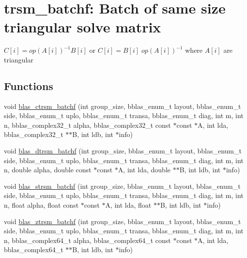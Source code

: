 \hypertarget{group__trsm__batchf}{}\section{trsm\+\_\+batchf\+: Batch of same size triangular solve matrix}
\label{group__trsm__batchf}


$ C[i] = op(A[i])^{-1} B[i] $ or $ C[i] = B[i] \;op(A[i])^{-1} $ where $ A[i] $ are triangular  


\subsection*{Functions}
\begin{DoxyCompactItemize}
\item 
void \mbox{\hyperlink{group__trsm__batchf_ga8d26eef5fac78c6c866b81bfd73ec443}{blas\+\_\+ctrsm\+\_\+batchf}} (int group\+\_\+size, bblas\+\_\+enum\+\_\+t layout, bblas\+\_\+enum\+\_\+t side, bblas\+\_\+enum\+\_\+t uplo, bblas\+\_\+enum\+\_\+t transa, bblas\+\_\+enum\+\_\+t diag, int m, int n, bblas\+\_\+complex32\+\_\+t alpha, bblas\+\_\+complex32\+\_\+t const $\ast$const $\ast$A, int lda, bblas\+\_\+complex32\+\_\+t $\ast$$\ast$B, int ldb, int $\ast$info)
\item 
void \mbox{\hyperlink{group__trsm__batchf_gaaf04f4a1d924157736c9712a82b556bb}{blas\+\_\+dtrsm\+\_\+batchf}} (int group\+\_\+size, bblas\+\_\+enum\+\_\+t layout, bblas\+\_\+enum\+\_\+t side, bblas\+\_\+enum\+\_\+t uplo, bblas\+\_\+enum\+\_\+t transa, bblas\+\_\+enum\+\_\+t diag, int m, int n, double alpha, double const $\ast$const $\ast$A, int lda, double $\ast$$\ast$B, int ldb, int $\ast$info)
\item 
void \mbox{\hyperlink{group__trsm__batchf_ga3a305094ed72cc68fa60e4a749f56e1f}{blas\+\_\+strsm\+\_\+batchf}} (int group\+\_\+size, bblas\+\_\+enum\+\_\+t layout, bblas\+\_\+enum\+\_\+t side, bblas\+\_\+enum\+\_\+t uplo, bblas\+\_\+enum\+\_\+t transa, bblas\+\_\+enum\+\_\+t diag, int m, int n, float alpha, float const $\ast$const $\ast$A, int lda, float $\ast$$\ast$B, int ldb, int $\ast$info)
\item 
void \mbox{\hyperlink{group__trsm__batchf_ga262ec8615f2eaa0ab09966b69aba9a17}{blas\+\_\+ztrsm\+\_\+batchf}} (int group\+\_\+size, bblas\+\_\+enum\+\_\+t layout, bblas\+\_\+enum\+\_\+t side, bblas\+\_\+enum\+\_\+t uplo, bblas\+\_\+enum\+\_\+t transa, bblas\+\_\+enum\+\_\+t diag, int m, int n, bblas\+\_\+complex64\+\_\+t alpha, bblas\+\_\+complex64\+\_\+t const $\ast$const $\ast$A, int lda, bblas\+\_\+complex64\+\_\+t $\ast$$\ast$B, int ldb, int $\ast$info)
\end{DoxyCompactItemize}


